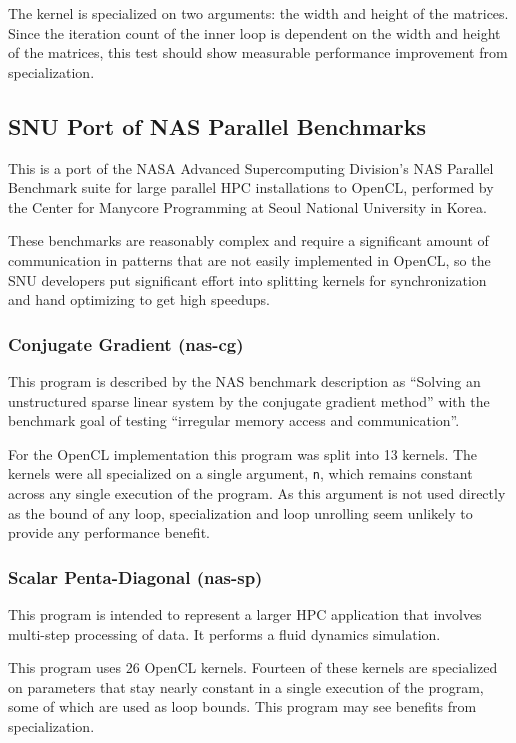 \documentclass{acm_proc_article-sp}
\begin{document}
The kernel is specialized on two arguments: the width and height of the
matrices. Since the iteration count of the inner loop is dependent on the width
and height of the matrices, this test should show measurable performance
improvement from specialization.

\subsection{SNU Port of NAS Parallel Benchmarks}

This is a port of the NASA Advanced Supercomputing Division's NAS Parallel
Benchmark\cite{Van:2002:NAS} suite for large parallel HPC installations to
OpenCL, performed by the Center for Manycore Programming at Seoul National
University in Korea\cite{Seo:2011:NASPerf}.

These benchmarks are reasonably complex and require a significant amount of
communication in patterns that are not easily implemented in OpenCL, so the SNU
developers put significant effort into splitting kernels for synchronization
and hand optimizing to get high speedups.

\subsubsection{Conjugate Gradient (nas-cg)}

This program is described by the NAS benchmark description as ``Solving an
unstructured sparse linear system by the conjugate gradient method'' with the
benchmark goal of testing ``irregular memory access and communication''.

For the OpenCL implementation this program was split into 13 kernels. The kernels
were all specialized on a single argument, {\tt n}, which remains constant across
any single execution of the program. As this argument is not used directly as
the bound of any loop, specialization and loop unrolling seem unlikely to provide
any performance benefit.

\subsubsection{Scalar Penta-Diagonal (nas-sp)}

This program is intended to represent a larger HPC application that involves
multi-step processing of data. It performs a fluid dynamics simulation.

This program uses 26 OpenCL kernels. Fourteen of these kernels are specialized
on parameters that stay nearly constant in a single execution of the program,
some of which are used as loop bounds. This program may see benefits from
specialization.
\end{document}
